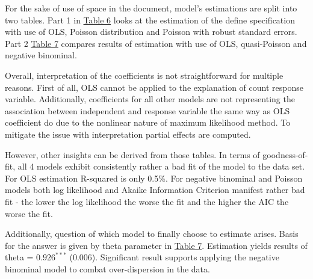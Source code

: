 \documentclass{article}
\begin{document}
For the sake of use of space in the document, model's estimations are split into two tables. Part 1 in \hyperref[tab:countmodels1]{Table 6} looks at the estimation of the define specification with use of OLS, Poisson distribution and Poisson with robust standard errors. Part 2 \hyperref[tab:countmodels2]{Table 7} compares results of estimation with use of OLS, quasi-Poisson and negative binominal. 

Overall, interpretation of the coefficients is not straightforward for multiple reasons. First of all, OLS cannot be applied to the explanation of count response variable. Additionally, coefficients for all other models are not representing the association between independent and response variable the same way as OLS coefficient do due to the nonlinear nature of maximum likelihood method. To mitigate the issue with interpretation partial effects are computed.

However, other insights can be derived from those tables. In terms of goodness-of-fit, all 4 models exhibit consistently rather a bad fit of the model to the data set. For OLS estimation R-squared is only 0.5\%. For negative binominal and Poisson models both log likelihood and Akaike Information Criterion manifest rather bad fit - the lower the log likelihood the worse the fit and the higher the AIC the worse the fit. 

Additionally, question of which model to finally choose to estimate arises. Basis for the answer is given by theta parameter in \hyperref[tab:countmodels2]{Table 7}. Estimation yields results of theta =  $0.926^{***}$ (0.006). Significant result supports applying the negative binominal model to combat over-dispersion in the data.
\end{document}
